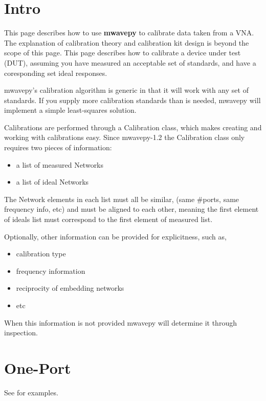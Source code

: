 \documentclass[letterpaper,10pt,english]{sphinxmanual}
\begin{document}
\section{Intro}
\label{calibration:intro}
This page describes how to use \textbf{mwavepy} to calibrate data taken from a VNA. The explanation of calibration theory and calibration kit design is beyond the scope of this  page. This page describes how to calibrate a device under test (DUT), assuming you have measured an acceptable set of standards, and have a coresponding set ideal responses.

mwavepy's calibration algorithm is generic in that it will work with any set of standards. If you supply more calibration standards than is needed, mwavepy will implement a simple least-squares solution.

Calibrations are performed through a Calibration class, which makes creating and working with calibrations easy. Since mwavepy-1.2 the Calibration class only requires two pieces of information:
\begin{itemize}
\item {} 
a list of measured Networks

\item {} 
a list of ideal Networks

\end{itemize}

The Network elements in each list must all be similar, (same \#ports, same frequency info, etc) and must be aligned to each other, meaning the first element of ideals list must correspond to the first element of measured list.

Optionally, other information can be provided for explicitness, such as,
\begin{itemize}
\item {} 
calibration type

\item {} 
frequency information

\item {} 
reciprocity of embedding networks

\item {} 
etc

\end{itemize}

When this information is not provided mwavepy will determine it through inspection.


\section{One-Port}
\label{calibration:one-port}
See  for examples.
\end{document}
